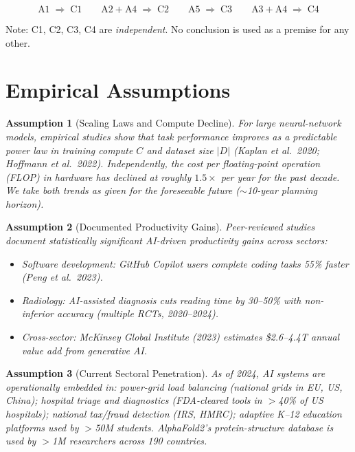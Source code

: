 \documentclass[12pt]{article}
\newtheorem{assumption}{Assumption}
\begin{document}
\[
\text{A1} \;\Rightarrow\; \text{C1}
\qquad
\text{A2}+\text{A4} \;\Rightarrow\; \text{C2}
\qquad
\text{A5} \;\Rightarrow\; \text{C3}
\qquad
\text{A3}+\text{A4} \;\Rightarrow\; \text{C4}
\]

\noindent Note: C1, C2, C3, C4 are \emph{independent}.  No conclusion is used
as a premise for any other.

\section*{Empirical Assumptions}

\begin{assumption}[Scaling Laws and Compute Decline]\label{A1}
  For large neural-network models, empirical studies show that task performance
  improves as a predictable power law in training compute $C$ and dataset size
  $|D|$ (Kaplan et al.\ 2020; Hoffmann et al.\ 2022).  Independently, the
  cost per floating-point operation (FLOP) in hardware has declined at
  roughly $1.5\times$ per year for the past decade.  We take both trends as
  given for the foreseeable future ($\sim$10-year planning horizon).
\end{assumption}

\begin{assumption}[Documented Productivity Gains]\label{A2}
  Peer-reviewed studies document statistically significant AI-driven
  productivity gains across sectors:
  \begin{itemize}
    \item Software development: GitHub Copilot users complete coding tasks
      55\% faster (Peng et al.\ 2023).
    \item Radiology: AI-assisted diagnosis cuts reading time by 30--50\%
      with non-inferior accuracy (multiple RCTs, 2020--2024).
    \item Cross-sector: McKinsey Global Institute (2023) estimates
      \$2.6--4.4T annual value add from generative AI.
  \end{itemize}
\end{assumption}

\begin{assumption}[Current Sectoral Penetration]\label{A3}
  As of 2024, AI systems are \emph{operationally embedded} in:
  power-grid load balancing (national grids in EU, US, China);
  hospital triage and diagnostics (FDA-cleared tools in $>$40\% of US
  hospitals); national tax/fraud detection (IRS, HMRC);
  adaptive K--12 education platforms used by $>$50M students.
  AlphaFold2's protein-structure database is used by $>$1M researchers across
  190 countries.
\end{assumption}
\end{document}
